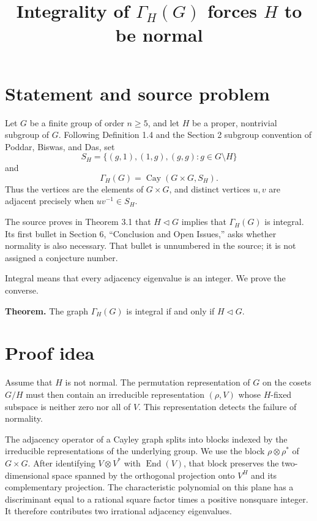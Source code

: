 \documentclass[11pt]{article}
\title{Integrality of \(\Gamma_H(G)\) forces \(H\) to be normal}
\author{}
\date{}
\begin{document}
\maketitle

\section*{Statement and source problem}

Let \(G\) be a finite group of order \(n\geq 5\), and let \(H\) be a
proper, nontrivial subgroup of \(G\). Following Definition 1.4 and the Section 2 subgroup convention of Poddar,
Biswas, and Das, set
\[
 S_H=\{(g,1),(1,g),(g,g):g\in G\setminus H\}
\]
and
\[
 \Gamma_H(G)=\operatorname{Cay}(G\times G,S_H).
\]
Thus the vertices are the elements of \(G\times G\), and distinct vertices
\(u,v\) are adjacent precisely when \(uv^{-1}\in S_H\).

The source proves in Theorem 3.1 that \(H\lhd G\) implies that
\(\Gamma_H(G)\) is integral. Its first bullet in Section 6, ``Conclusion and
Open Issues,'' asks whether normality is also necessary. That bullet is
unnumbered in the source; it is not assigned a conjecture number.

Integral means that every adjacency eigenvalue is an integer. We prove the converse.

\textbf{Theorem.} The graph \(\Gamma_H(G)\) is integral if and only if
\(H\lhd G\).

\section*{Proof idea}

Assume that \(H\) is not normal. The permutation representation of \(G\) on
the cosets \(G/H\) must then contain an irreducible representation
\((\rho,V)\) whose \(H\)-fixed subspace is neither zero nor all of \(V\).
This representation detects the failure of normality.

The adjacency operator of a Cayley graph splits into blocks indexed by the
irreducible representations of the underlying group. We use the block
\(\rho\otimes\rho^*\) of \(G\times G\). After identifying
\(V\otimes V^*\) with \(\operatorname{End}(V)\), that block preserves the
two-dimensional space spanned by the orthogonal projection onto \(V^H\)
and its complementary projection. The characteristic polynomial on this
plane has a discriminant equal to a rational square factor times a positive
nonsquare integer. It therefore contributes two irrational adjacency
eigenvalues.
\end{document}
